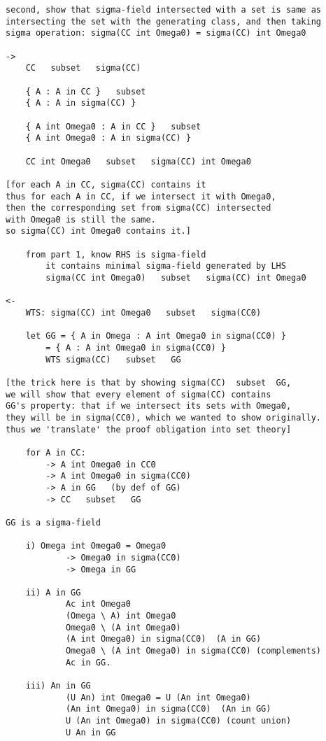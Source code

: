 \documentclass{article}
\begin{document}
\begin{flushleft}
\begin{verbatim}
second, show that sigma-field intersected with a set is same as 
intersecting the set with the generating class, and then taking 
sigma operation: sigma(CC int Omega0) = sigma(CC) int Omega0

->
    CC   subset   sigma(CC)

    { A : A in CC }   subset   
    { A : A in sigma(CC) }

    { A int Omega0 : A in CC }   subset   
    { A int Omega0 : A in sigma(CC) }

    CC int Omega0   subset   sigma(CC) int Omega0

[for each A in CC, sigma(CC) contains it
thus for each A in CC, if we intersect it with Omega0, 
then the corresponding set from sigma(CC) intersected 
with Omega0 is still the same. 
so sigma(CC) int Omega0 contains it.]

    from part 1, know RHS is sigma-field
        it contains minimal sigma-field generated by LHS
        sigma(CC int Omega0)   subset   sigma(CC) int Omega0

<-
    WTS: sigma(CC) int Omega0   subset   sigma(CC0)

    let GG = { A in Omega : A int Omega0 in sigma(CC0) }
        = { A : A int Omega0 in sigma(CC0) }
        WTS sigma(CC)   subset   GG

[the trick here is that by showing sigma(CC)  subset  GG, 
we will show that every element of sigma(CC) contains 
GG's property: that if we intersect its sets with Omega0, 
they will be in sigma(CC0), which we wanted to show originally. 
thus we 'translate' the proof obligation into set theory]

    for A in CC:
        -> A int Omega0 in CC0
        -> A int Omega0 in sigma(CC0)
        -> A in GG   (by def of GG)
        -> CC   subset   GG

GG is a sigma-field

    i) Omega int Omega0 = Omega0 
            -> Omega0 in sigma(CC0)
            -> Omega in GG

    ii) A in GG
            Ac int Omega0
            (Omega \ A) int Omega0
            Omega0 \ (A int Omega0)
            (A int Omega0) in sigma(CC0)  (A in GG)
            Omega0 \ (A int Omega0) in sigma(CC0) (complements)
            Ac in GG.

    iii) An in GG
            (U An) int Omega0 = U (An int Omega0)
            (An int Omega0) in sigma(CC0)  (An in GG)
            U (An int Omega0) in sigma(CC0) (count union)
            U An in GG


\end{verbatim}
\end{flushleft}
\end{document}
